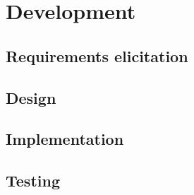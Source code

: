 \chapter{Development}
\section{Requirements elicitation}
\section{Design}
\section{Implementation}
\section{Testing}